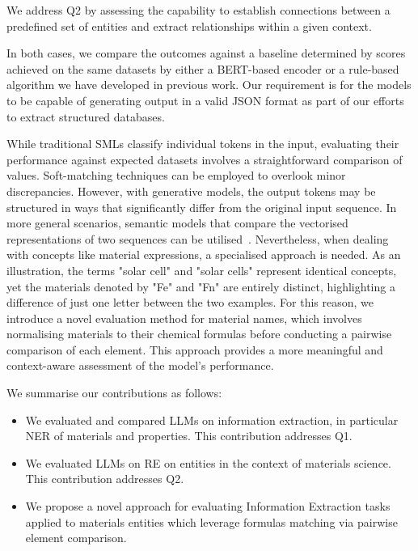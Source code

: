 We address Q2 by assessing the capability to establish connections between a predefined set of entities and extract relationships within a given context.  

In both cases, we compare the outcomes against a baseline determined by scores achieved on the same datasets by either a BERT-based encoder or a rule-based algorithm we have developed in previous work.
Our requirement is for the models to be capable of generating output in a valid JSON format as part of our efforts to extract structured databases.
 
While traditional SMLs classify individual tokens in the input, evaluating their performance against expected datasets involves a straightforward comparison of values. Soft-matching techniques can be employed to overlook minor discrepancies. 
However, with generative models, the output tokens may be structured in ways that significantly differ from the original input sequence. 
In more general scenarios, semantic models that compare the vectorised representations of two sequences can be utilised~\cite{reimers2019sentencebert}. 
Nevertheless, when dealing with concepts like material expressions, a specialised approach is needed. 
As an illustration, the terms "solar cell" and "solar cells" represent identical concepts, yet the materials denoted by "Fe" and "Fn" are entirely distinct, highlighting a difference of just one letter between the two examples.
For this reason, we introduce a novel evaluation method for material names, which involves normalising materials to their chemical formulas before conducting a pairwise comparison of each element. This approach provides a more meaningful and context-aware assessment of the model's performance.

We summarise our contributions as follows: 

\begin{itemize}
    \item We evaluated and compared LLMs on information extraction, in particular NER of materials and properties. This contribution addresses Q1. 
    \item We evaluated LLMs on RE on entities in the context of materials science. This contribution addresses Q2.
    \item We propose a novel approach for evaluating Information Extraction tasks applied to materials entities which leverage formulas matching via pairwise element comparison.
\end{itemize}




